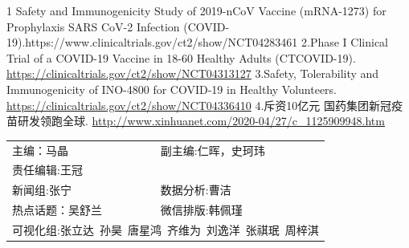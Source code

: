 \documentclass[]{article}
\begin{document}
1 Safety and Immunogenicity Study of 2019-nCoV Vaccine (mRNA-1273) for
Prophylaxis SARS CoV-2 Infection
(COVID-19).https://www.clinicaltrials.gov/ct2/show/NCT04283461 2.Phase I
Clinical Trial of a COVID-19 Vaccine in 18-60 Healthy Adults
(CTCOVID-19). \url{https://clinicaltrials.gov/ct2/show/NCT04313127}
3.Safety, Tolerability and Immunogenicity of INO-4800 for COVID-19 in
Healthy Volunteers.
\url{https://clinicaltrials.gov/ct2/show/NCT04336410} 4.斥资10亿元
国药集团新冠疫苗研发领跑全球.
\url{http://www.xinhuanet.com/2020-04/27/c_1125909948.htm}

\vspace{5mm}

\centering
\fontsize{12}{12}
\selectfont
\begin{tabular}{ll}


主编：马晶  &  副主编:仁晖，史珂玮 \\
责任编辑:王冠  \\
新闻组:张宁  &  数据分析:曹洁 \\
热点话题：吴舒兰 & 微信排版:韩佩瑾 \\
\multicolumn{2}{l}{可视化组:张立达\, 孙昊\, 唐星鸿\, 齐维为\, 刘逸洋\, 张祺珉\, 周梓淇}

\end{tabular}
\end{document}
